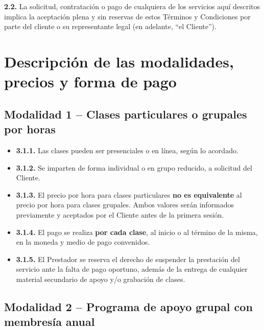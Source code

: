 \documentclass[12pt, letterpaper]{article}
\begin{document}
\vspace{4pt}
\noindent\textbf{2.2.} La solicitud, contratación o pago de cualquiera de los servicios aquí descritos implica la aceptación plena y sin reservas de estos Términos y Condiciones por parte del cliente o su representante legal (en adelante, ``el Cliente'').

\section{Descripción de las modalidades, precios y forma de pago}

\subsection{Modalidad 1 -- Clases particulares o grupales por horas}

\begin{itemize}[leftmargin=1.5em, itemsep=3pt, topsep=4pt]
  \item \textbf{3.1.1.} Las clases pueden ser presenciales o en línea, según lo acordado.
  \item \textbf{3.1.2.} Se imparten de forma individual o en grupo reducido, a solicitud del Cliente.
  \item \textbf{3.1.3.} El precio por hora para clases particulares \textbf{no es equivalente} al precio por hora para clases grupales. Ambos valores serán informados previamente y aceptados por el Cliente antes de la primera sesión.
  \item \textbf{3.1.4.} El pago se realiza \textbf{por cada clase}, al inicio o al término de la misma, en la moneda y medio de pago convenidos.
  \item \textbf{3.1.5.} El Prestador se reserva el derecho de suspender la prestación del servicio ante la falta de pago oportuno, además de la entrega de cualquier material secundario de apoyo y/o grabación de clases.
\end{itemize}

\subsection{Modalidad 2 -- Programa de apoyo grupal con membresía anual}
\end{document}
